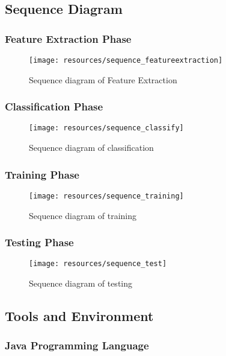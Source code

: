 \subsection{Sequence Diagram}
\subsubsection{Feature Extraction Phase}
\begin{figure}[h!]
        \centering
        \texttt{[image: resources/sequence\_featureextraction]}
        \caption{Sequence diagram of Feature Extraction}
        \label{fig:sequence_featureextraction}
\end{figure}
\newpage
\subsubsection{Classification Phase}
\begin{figure}[h!]
        \centering
        \texttt{[image: resources/sequence\_classify]}
        \caption{Sequence diagram of classification}
        \label{fig:sequence_classify}
\end{figure}
\newpage
\subsubsection{Training Phase}
\begin{figure}[h!]
        \centering
        \texttt{[image: resources/sequence\_training]}
        \caption{Sequence diagram of training}
        \label{fig:sequence_training}
\end{figure}
\newpage
\newpage
\subsubsection{Testing Phase}
\begin{figure}[h!]
        \centering
        \texttt{[image: resources/sequence\_test]}
        \caption{Sequence diagram of testing}
        \label{fig:sequence_test}
\end{figure}


\subsection{Tools and Environment}

\subsubsection{Java Programming Language}

